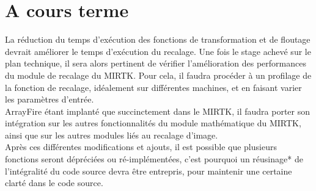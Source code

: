 \documentclass[10pt]{report}
\begin{document}
	\section{A cours terme}
	 La réduction du temps d'exécution des fonctions de transformation et de floutage devrait améliorer le temps d'exécution du recalage. Une fois le stage achevé sur le plan technique, il sera alors pertinent de vérifier l'amélioration des performances du module de recalage du MIRTK. Pour cela, il faudra procéder à un profilage de la fonction de recalage, idéalement sur différentes machines, et en faisant varier les paramètres d'entrée.\\
	 ArrayFire étant implanté que succinctement dans le MIRTK, il faudra porter son intégration sur les autres fonctionnalités du module mathématique du MIRTK, ainsi que sur les autres modules liés au recalage d'image.\\
	 Après ces différentes modifications et ajouts, il est possible que plusieurs fonctions seront dépréciées ou ré-implémentées, c'est pourquoi un réusinage* de l'intégralité du code source devra être entrepris, pour maintenir une certaine clarté dans le code source.\\ 
\end{document}
